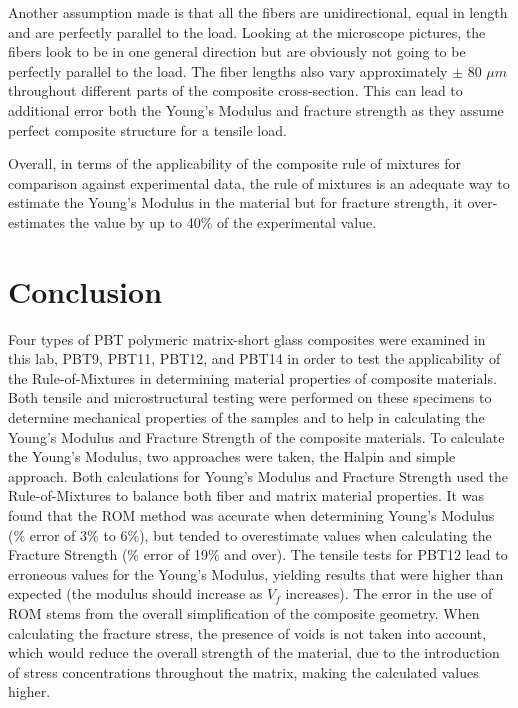 \documentclass[11pt]{article}
\begin{document}
Another assumption made is that all the fibers are unidirectional, equal in length and are perfectly parallel to the load. Looking at the microscope pictures, the fibers look to be in one general direction but are obviously not going to be perfectly parallel to the load. The fiber lengths also vary approximately $\pm$ 80 $\mu m$ throughout different parts of the composite cross-section. This can lead to additional error both the Young's Modulus and fracture strength as they assume perfect composite structure for a tensile load.
\singlespacing

Overall, in terms of the applicability of the composite rule of mixtures for comparison against experimental data, the rule of mixtures is an adequate way to estimate the Young's Modulus in the material but for fracture strength, it over-estimates the value by up to 40\% of the experimental value.

\section{Conclusion}

Four types of PBT polymeric matrix-short glass composites were examined in this lab, PBT9, PBT11, PBT12, and PBT14 in order to test the applicability of the Rule-of-Mixtures in determining material properties of composite materials. Both tensile and microstructural testing were performed on these specimens to determine mechanical properties of the samples and to help in calculating the Young's Modulus and Fracture Strength of the composite materials. To calculate the Young's Modulus, two approaches were taken, the Halpin and simple approach. Both calculations for Young's Modulus and Fracture Strength used the Rule-of-Mixtures to balance both fiber and matrix material properties. It was found that the ROM method was  accurate when determining Young's Modulus (\% error of 3\% to 6\%), but tended to overestimate values when calculating the Fracture Strength (\% error of 19\% and over). The tensile tests for PBT12 lead to erroneous values for the Young's Modulus, yielding results that were higher than expected (the modulus should increase as \(V_f\) increases).
\singlespacing
The error in the use of ROM stems from the overall simplification of the composite geometry. When calculating the fracture stress, the presence of voids is not taken into account, which would reduce the overall strength of the material, due to the introduction of stress concentrations throughout the matrix, making the calculated values higher. 
\end{document}
